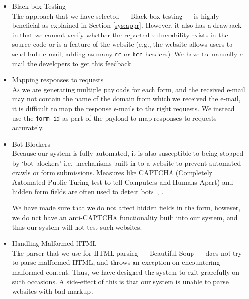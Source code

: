 \begin{itemize}
	\item Black-box Testing\\
	The approach that we have selected --- Black-box testing --- is highly beneficial as explained in Section \ref{sys:appr}. However, it also has a drawback in that we cannot verify whether the reported vulnerability exists in the source code or is a feature of the website (e.g., the website allows users to send bulk e-mail, adding as many \texttt{cc} or \texttt{bcc} headers). We have to manually e-mail the developers to get this feedback.
	
	\item Mapping responses to requests\\
	As we are generating multiple payloads for each form, and the received e-mail may not contain the name of the domain from which we received the e-mail, it is difficult to map the response e-mails to the right requests. We instead use the \texttt{form\_id} as part of the payload to map responses to requests accurately.
	
	\item Bot Blockers\\
	\label{issues:captcha}
    Because our system is fully automated, it is also susceptible to being stopped by `bot-blockers' i.e.\ mechanisms built-in to a website to prevent automated crawls or form submissions. Measures like CAPTCHA (Completely Automated Public Turing test to tell Computers and Humans Apart) and hidden form fields are often used to detect bots~\cite{captchas3}, \cite{captchas2}.
    
    We have made sure that we do not affect hidden fields in the form, however, we do not have an anti-CAPTCHA functionality built into our system, and thus our system will not test such websites.
    
	\item Handling Malformed HTML\\
    The parser that we use for HTML parsing --- Beautiful Soup --- does not try to parse malformed HTML, and throws an exception on encountering malformed content. Thus, we have designed the system to exit gracefully on such occasions. A side-effect of this is that our system is unable to parse websites with bad markup\,\footnotemark.
    
	

\end{itemize}
